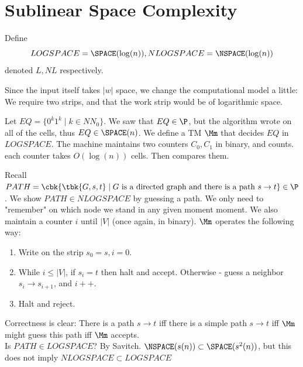 \section{Sublinear Space Complexity}
\begin{yellowBox}
	\begin{defn}
		Define $$LOGSPACE = \SPACE(\log(n)), NLOGSPACE =\NSPACE(\log(n))$$ denoted $L,NL$ respectively.
	\end{defn}
\begin{remark}
	Since the input itself takes $|w|$ space, we change the computational model a little: We require two strips, and that the work strip would be of logarithmic space.
\end{remark}
\end{yellowBox}
\begin{example}
	Let $EQ = \{0^k1^k\mid k\in NN_0\}$. We saw that $EQ\in \P$, but the algorithm wrote on all of the cells, thus $EQ\in \SPACE(n)$. We define a TM $\Mm$ that decides $EQ$ in $LOGSPACE$. The machine maintains two counters $C_0, C_1$ in binary, and counts. each counter takes $O(\log(n))$ cells. Then compares them.
\end{example}
\begin{example}
	Recall $PATH = \cbk{\tbk{G,s,t}\mid G\text{ is a directed graph and there is a path }s\to t}\in \P$. We show $PATH\in NLOGSPACE$ by guessing a path. We only need to "remember" on which node we stand in any given moment moment. We also maintain a counter $i$ until $|V|$ (once again, in binary). $\Mm$ operates the following way:
	\begin{enumerate}
		\item Write on the strip $s_0 = s, i=0$.
		\item While $i\leq |V|$, if $s_i = t$ then halt and accept. Otherwise - guess a neighbor $s_i\to s_{i+1}$, and $i++$.  
		\item Halt and reject.
	\end{enumerate}
Correctness is clear: There is a path $s\to t$ iff there is a simple path $s\to t$ iff $\Mm$ might guess this path iff $\Mm$ accepts.\\

Is $PATH\in LOGSPACE$? By Savitch. $\NSPACE(s(n))\subset \SPACE(s^2(n))$, but this does not imply $NLOGSPACE\subset LOGSPACE$
\end{example}
